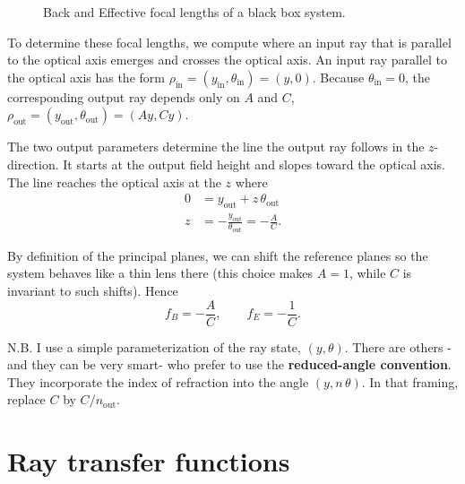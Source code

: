 \documentclass[
  letterpaper,
]{book}
\begin{document}
\begin{figure}


\caption{\label{fig-efl-bfl}Back and Effective focal lengths of a black
box system.}

\end{figure}%

To determine these focal lengths, we compute where an input ray that is
parallel to the optical axis emerges and crosses the optical axis. An
input ray parallel to the optical axis has the form
\(\rho_{\text{in}}=(y_{\text{in}},\theta_{\text{in}})=(y,0)\). Because
\(\theta_{\text{in}}=0\), the corresponding output ray depends only on
\(A\) and \(C\),
\(\rho_{\text{out}}=(y_{\text{out}},\theta_{\text{out}})=(A y, C y)\).

The two output parameters determine the line the output ray follows in
the \(z\)-direction. It starts at the output field height and slopes
toward the optical axis. The line reaches the optical axis at the \(z\)
where \[
\begin{aligned}
0 &= y_{\text{out}} + z\,\theta_{\text{out}} \\
z &= -\frac{y_{\text{out}}}{\theta_{\text{out}}} = -\frac{A}{C}.
\end{aligned}
\]

By definition of the principal planes, we can shift the reference planes
so the system behaves like a thin lens there (this choice makes \(A=1\),
while \(C\) is invariant to such shifts). Hence \[
f_{B} = -\frac{A}{C},
\qquad
f_{E} = -\frac{1}{C}.
\]

N.B. I use a simple parameterization of the ray state, \((y,\theta)\).
There are others -and they can be very smart- who prefer to use the
\textbf{reduced-angle convention}. They incorporate the index of
refraction into the angle \((y,n\,\theta)\). In that framing, replace
\(C\) by \(C/n_{\text{out}}\).

\section{Ray transfer functions}\label{sec-optics-raytransfer}
\end{document}
